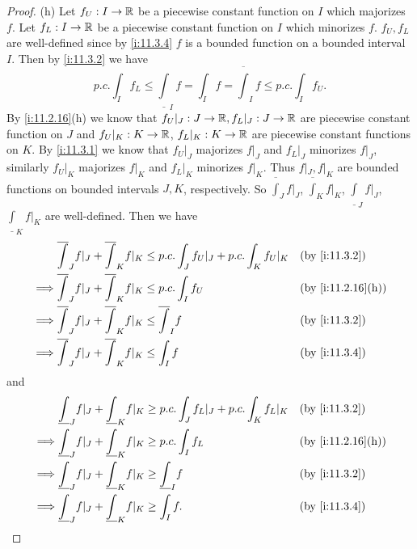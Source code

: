 \begin{proof}{(h)}
  Let \(f_U : I \to \mathbb{R}\) be a piecewise constant function on \(I\) which majorizes \(f\).
  Let \(f_L : I \to \mathbb{R}\) be a piecewise constant function on \(I\) which minorizes \(f\).
  \(f_U, f_L\) are well-defined since by \cref{i:11.3.4} \(f\) is a bounded function on a bounded interval \(I\).
  Then by \cref{i:11.3.2} we have
  \[
    p.c. \int_I f_L \leq \underline{\int}_I f = \int_I f = \overline{\int}_I f \leq p.c. \int_I f_U.
  \]
  By \cref{i:11.2.16}(h) we know that \(f_U|_J : J \to \mathbb{R}, f_L|_J : J \to \mathbb{R}\) are piecewise constant function on \(J\) and \(f_U|_K : K \to \mathbb{R}\), \(f_L|_K : K \to \mathbb{R}\) are piecewise constant functions on \(K\).
  By \cref{i:11.3.1} we know that \(f_U|_J\) majorizes \(f|_J\) and \(f_L|_J\) minorizes \(f|_J\), similarly \(f_U|_K\) majorizes \(f|_K\) and \(f_L|_K\) minorizes \(f|_K\).
  Thus \(f|_J, f|_K\) are bounded functions on bounded intervals \(J, K\), respectively.
  So \(\overline{\int}_J f|_J\), \(\overline{\int}_K f|_K\), \(\underline{\int}_J f|_J\), \(\underline{\int}_K f|_K\) are well-defined.
  Then we have
  \begin{align*}
             & \overline{\int}_J f|_J + \overline{\int}_K f|_K \leq p.c. \int_J f_U|_J + p.c. \int_K f_U|_K &  & \by{i:11.3.2}     \\
    \implies & \overline{\int}_J f|_J + \overline{\int}_K f|_K \leq p.c. \int_I f_U                         &  & \by{i:11.2.16}[h] \\
    \implies & \overline{\int}_J f|_J + \overline{\int}_K f|_K \leq \overline{\int}_I f                     &  & \by{i:11.3.2}     \\
    \implies & \overline{\int}_J f|_J + \overline{\int}_K f|_K \leq \int_I f                                &  & \by{i:11.3.4}
  \end{align*}
  and
  \begin{align*}
             & \underline{\int}_J f|_J + \underline{\int}_K f|_K \geq p.c. \int_J f_L|_J + p.c. \int_K f_L|_K &  & \by{i:11.3.2}     \\
    \implies & \underline{\int}_J f|_J + \underline{\int}_K f|_K \geq p.c. \int_I f_L                         &  & \by{i:11.2.16}[h] \\
    \implies & \underline{\int}_J f|_J + \underline{\int}_K f|_K \geq \underline{\int}_I f                    &  & \by{i:11.3.2}     \\
    \implies & \underline{\int}_J f|_J + \underline{\int}_K f|_K \geq \int_I f.                               &  & \by{i:11.3.4}

\end{align*}
\end{proof}
